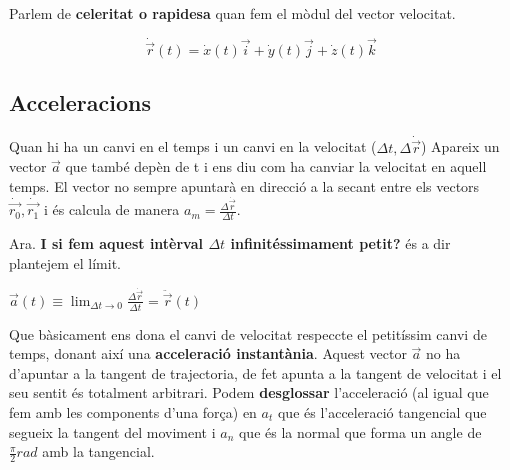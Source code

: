 \documentclass[12pt]{article}
\newcommand{\axes}[4]{%
  \draw[ax] (0,0) -- (#1,0) node[right, black] {#3};
  \draw[ax] (0,0) -- (0,#2) node[above, black] {#4};}
\begin{document}
Parlem de \textbf{celeritat o rapidesa} quan fem el mòdul del vector velocitat.

\[\dot{\vec{r}}(t) = \dot{x}(t)\vec{i} + \dot{y}(t)\vec{j} + \dot{z}(t)\vec{k}\]

\subsection{Acceleracions}

Quan hi ha un canvi en el temps i un canvi en la velocitat ($\Delta t, \Delta \dot{\vec{r}}$) Apareix un vector $\vec{a}$ que també depèn de t i ens diu com ha canviar la velocitat en aquell temps. El vector no sempre apuntarà en direcció a la secant entre els vectors $\dot{\vec{r_0}}, \dot{\vec{r_1}}$ i és calcula de manera $a_m = \frac{\Delta \dot{\vec{r}}}{\Delta t}$.

\begin{center}
\end{center}

Ara. \textbf{I si fem aquest intèrval $\Delta t$ infinitéssimament petit?} és a dir plantejem el límit.

$\vec{a}(t) \equiv \lim_{\Delta t \rightarrow 0} \frac{\Delta \dot{\vec{r}}}{\Delta t} = \ddot{\vec{r}}(t)$

Que bàsicament ens dona el canvi de velocitat respeccte el petitíssim canvi de temps, donant així una \textbf{acceleració instantània}. Aquest vector $\vec{a}$ no ha d'apuntar a la tangent de trajectoria, de fet apunta a la tangent de velocitat i el seu sentit és totalment arbitrari. Podem \textbf{desglossar} l'acceleració (al igual que fem amb les components d'una força) en \textit{$a_t$} que és l'acceleració tangencial que segueix la tangent del moviment i \textit{$a_n$} que és la normal que forma un angle de $\frac{\pi}{2}rad$ amb la tangencial.

\begin{center}
\end{center}
\end{document}
